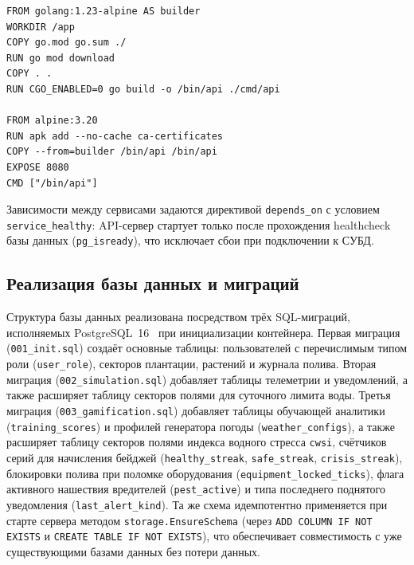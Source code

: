 \begin{lstlisting}[caption={Многоступенчатая сборка API-сервера (Dockerfile)}, label={lst:dockerfile}]
FROM golang:1.23-alpine AS builder
WORKDIR /app
COPY go.mod go.sum ./
RUN go mod download
COPY . .
RUN CGO_ENABLED=0 go build -o /bin/api ./cmd/api

FROM alpine:3.20
RUN apk add --no-cache ca-certificates
COPY --from=builder /bin/api /bin/api
EXPOSE 8080
CMD ["/bin/api"]
\end{lstlisting}

Зависимости между сервисами задаются директивой
\texttt{depends\_on} с условием \texttt{service\_healthy}:
API-сервер стартует только после прохождения healthcheck
базы данных (\texttt{pg\_isready}), что исключает сбои
при подключении к СУБД.


\subsection{Реализация базы данных и миграций}

Структура базы данных реализована посредством трёх SQL-миграций,
исполняемых PostgreSQL~16~\cite{postgresql_official,postgresql_16_release_notes}
при инициализации контейнера. Первая миграция
(\texttt{001\_init.sql}) создаёт основные таблицы: пользователей
с перечислимым типом роли (\texttt{user\_role}), секторов
плантации, растений и журнала полива. Вторая миграция
(\texttt{002\_simulation.sql}) добавляет таблицы телеметрии
и уведомлений, а также расширяет таблицу секторов полями
для суточного лимита воды. Третья миграция
(\texttt{003\_gamification.sql}) добавляет таблицы обучающей
аналитики (\texttt{training\_scores}) и профилей генератора
погоды (\texttt{weather\_configs}), а также расширяет таблицу
секторов полями индекса водного стресса \texttt{cwsi},
счётчиков серий для начисления бейджей (\texttt{healthy\_streak},
\texttt{safe\_streak}, \texttt{crisis\_streak}), блокировки
полива при поломке оборудования
(\texttt{equipment\_locked\_ticks}), флага активного нашествия
вредителей (\texttt{pest\_active}) и типа последнего поднятого
уведомления (\texttt{last\_alert\_kind}). Та же схема идемпотентно
применяется при старте сервера методом
\texttt{storage.EnsureSchema} (через
\texttt{ADD COLUMN IF NOT EXISTS} и
\texttt{CREATE TABLE IF NOT EXISTS}), что обеспечивает
совместимость с уже существующими базами данных без потери
данных.

